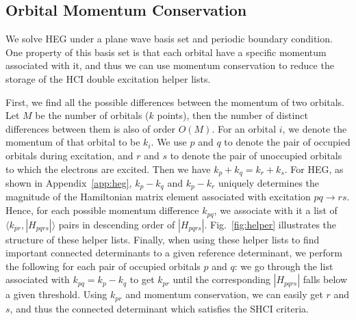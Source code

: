 \subsection{Orbital Momentum Conservation}
We solve HEG under a plane wave basis set and periodic boundary condition.
One property of this basis set is that each orbital have a specific momentum associated with it, and thus we can use momentum conservation to reduce the storage of the HCI double excitation helper lists.

First, we find all the possible differences between the momentum of two orbitals.
Let $M$ be the number of orbitals ($k$ points), then the number of distinct differences between them is also of order $O(M)$.
For an orbital $i$, we denote the momentum of that orbital to be $k_{i}$.
We use $p$ and $q$ to denote the pair of occupied orbitals during excitation, and $r$ and $s$ to denote the pair of unoccupied orbitals to which the electrons are excited.
Then we have $k_p + k_q = k_r + k_s$.
For HEG, as shown in Appendix~\ref{app:heg}, $k_p - k_q$ and $k_p - k_r$ uniquely determines the magnitude of the Hamiltonian matrix element associated with excitation $pq\to rs$.
Hence, for each possible momentum difference $k_{pq}$, we associate with it a list of $\langle k_{pr}, |H_{pqrs}|\rangle$ pairs in descending order of $|H_{pqrs}|$.
Fig.~\ref{fig:helper} illustrates the structure of these helper lists.
Finally, when using these helper lists to find important connected determinants to a given reference determinant, we perform the following for each pair of occupied orbitals $p$ and $q$: we go through the list associated with $k_{pq} = k_p - k_q$ to get $k_{pr}$ until the corresponding $|H_{pqrs}|$ falls below a given threshold.
Using $k_{pr}$ and momentum conservation, we can easily get $r$ and $s$, and thus the connected determinant which satisfies the SHCI criteria.
